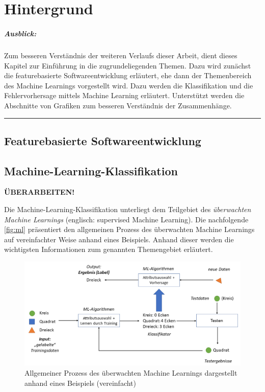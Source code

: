 
\chapter{Hintergrund}

\paragraph{Ausblick:}
Zum besseren Verständnis der weiteren Verlaufs dieser Arbeit, dient dieses Kapitel zur Einführung in die zugrundeliegenden Themen. Dazu wird zunächst die featurebasierte Softwareentwicklung erläutert, ehe dann der Themenbereich des Machine Learnings vorgestellt wird. Dazu werden die Klassifikation und die Fehlervorhersage mittels Machine Learning erläutert. Unterstützt werden die Abschnitte von Grafiken zum besseren Verständnis der Zusammenhänge.
\\
\hrule

\section{Featurebasierte Softwareentwicklung}

\section{Machine-Learning-Klassifikation}

\textbf{ÜBERARBEITEN!}

Die Machine-Learning-Klassifikation unterliegt dem Teilgebiet des \emph{überwachten Machine Learnings} (englisch: supervised Machine Learning). Die nachfolgende \autoref{fig:ml} präsentiert den allgemeinen Prozess des überwachten Machine Learnings auf vereinfachter Weise anhand eines Beispiels. Anhand dieser werden die wichtigsten Informationen zum genannten Themengebiet erläutert. 

\begin{figure}[H]
    \centering
    \captionsetup{justification=centering,margin=2cm}
    \includegraphics[width=\textwidth]{images/ML}
    \caption{Allgemeiner Prozess des überwachten Machine Learnings dargestellt anhand eines Beispiels (vereinfacht)}\label{fig:ml}
\end{figure}

